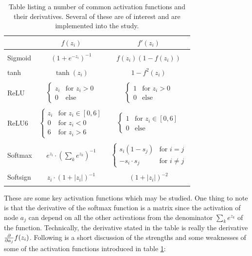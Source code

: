         \begin{table}[H]
            \centering
            \begin{tabular}[t]{l@{\hskip 0.4in}c@{\hskip 0.3in}c}
                \toprule
                 & $f(z_i)$ & $f'(z_i)$ \\
                \midrule\\
                Sigmoid & $(1+e^{-z_i})^{-1}$ & $f(z_i)\left( 1-f(z_i) \right)$ \\\\
                tanh & $\tanh (z_i)$ & $1-f^2(z_i)$ \\\\
                ReLU & $\begin{cases} z_i & \text{for } z_i>0 \\ 0 & \text{else} \end{cases}$ & $\begin{cases} 1 & \text{for } z_i>0 \\ 0 & \text{else} \end{cases}$ \\\\
                ReLU6 & $\begin{cases} z_i & \text{for } z_i\in[0,6] \\ 0 & \text{for } z_i<0 \\ 6 & \text{for } z_i>6 \end{cases}$ & $\begin{cases} 1 & \text{for } z_i\in [0,6] \\ 0 & \text{else} \end{cases}$ \\\\
                Softmax & $e^{z_i}\cdot(\sum_k e^{z_k})^{-1}$ & $\begin{cases}s_i(1-s_j) & \text{for } i=j\\ -s_i\cdot s_j & \text{for } i\neq j \end{cases}$ \\\\
                Softsign & $z_i\cdot \left( 1+|z_i| \right)^{-1}$ & $\left( 1+|z_i| \right)^{-2}$\\\\
                \bottomrule
            \end{tabular}
            \caption{Table listing a number of common activation functions and their derivatives. Several of these are of interest and are implemented into the study.}
            \label{tab:activation_functions}
        \end{table}
        These are some key activation functions which may be studied. One thing to note is that the derivative of the softmax function is a matrix since the activation of node $a_j$ can depend on all the other activations from the denominator $\sum_ke^{z_k}$ of the function. Technically, the derivative stated in the table is really the derivative $\pdv{}{a_j}f(z_i)$. Following is a short discussion of the strengths and some weaknesses of some of the activation functions introduced in table \ref{tab:activation_functions}:
